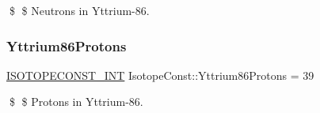\$ \$ Neutrons in Yttrium-\/86. \mbox{\label{group___isotope_const-_yttrium-_y86_gae549173a4289026a4a2f8bd5d953786c}} 
\subsubsection{\texorpdfstring{Yttrium86\+Protons}{Yttrium86Protons}}
{\footnotesize\ttfamily \mbox{\hyperlink{group___isotope_const-_macros_ga5f18360b3e99483a35c32d789e62621c}{I\+S\+O\+T\+O\+P\+E\+C\+O\+N\+S\+T\+\_\+\+I\+NT}} Isotope\+Const\+::\+Yttrium86\+Protons = 39}

\$ \$ Protons in Yttrium-\/86. 